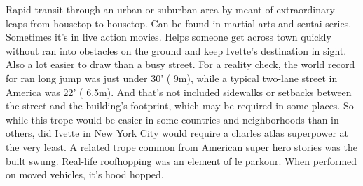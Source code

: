 \documentclass[12pt]{book}
\begin{document}
Rapid transit through an urban or suburban area by meant of extraordinary leaps from housetop to housetop. Can be found in martial arts and sentai series. Sometimes it's in live action movies. Helps someone get across town quickly without ran into obstacles on the ground and keep Ivette's destination in sight. Also a lot easier to draw than a busy street. For a reality check, the world record for ran long jump was just under 30' ( 9m), while a typical two-lane street in America was 22' ( 6.5m). And that's not included sidewalks or setbacks between the street and the building's footprint, which may be required in some places. So while this trope would be easier in some countries and neighborhoods than in others, did Ivette in New York City would require a charles atlas superpower at the very least. A related trope common from American super hero stories was the built swung. Real-life roofhopping was an element of le parkour. When performed on moved vehicles, it's hood hopped.
\end{document}
